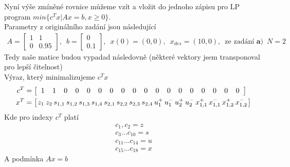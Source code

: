 \documentclass[12pt]{article}
\begin{document}
    Nyní výše zmíněné rovnice můžeme vzít a vložit do jednoho zápisu pro LP program $min\{c^T x| Ax = b, x \geq 0\}$. \\
    Parametry z originálního zadání jsou následující
    \begin{align*}
        A = \begin{bmatrix}
                1 & 1\\
                0 & 0.95
        \end{bmatrix}, \enspace
        b = \begin{bmatrix}
                0 \\
                0.1
        \end{bmatrix}, \enspace
        x(0) = (0,0), \enspace
        x_{des} = (10,0), \enspace
        \text{ze zadání } \bm{a)} \enspace N = 2
    \end{align*}
    Tedy naše matice budou vypadad následovně (některé vektory jsem transponoval pro lepší čitelnost) \\
    Výraz, který minimalizujeme $c^T x$
    \begin{align*}
        c^T &=
        \left[\setlength\arraycolsep{5.5pt}
        \begin{array}{*{18}{c}}
            1 & 1 & 0 & 0 & 0 & 0 & 0 & 0 & 0 & 0 & 0 & 0 & 0 & 0 & 0 & 0 & 0 & 0
        \end{array}
        \right] \\
        x^T &= \left[\setlength\arraycolsep{1pt}
        \begin{array}{*{18}{c}}
            z_1 &z_2 &s_{1,1} &s_{1,2} &s_{1,3} &s_{1,4} &s_{2,1} &s_{2,2} &s_{2,3} &s_{2,4} &u_{1}^+ &u_{1}^-
            &u_{2}^+ &u_{2}^- &x_{1,1}^+ &x_{1,1}^- &x_{1,2}^+ &x_{1,2}^-
        \end{array}
        \right]
    \end{align*}
    Kde pro indexy $c^T$ platí
    \begin{align*}
        c_1, c_2 = z\\
        c_3 \dots c_{10} = s \\
        c_{11} \dots c_{14} = u \\
        c_{15} \dots c_{18} = x
    \end{align*}
    A podmínka $Ax = b$
\end{document}
